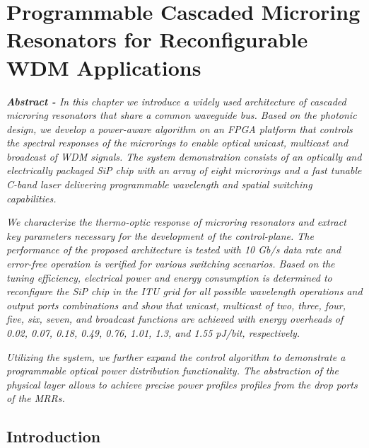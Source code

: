 
\pagestyle{plain}


\chapter[Cascaded Silicon Photonic Ring Resonators Architecture for Reconfigurable WDM Applications][Top of Page Title]{Programmable Cascaded Microring Resonators for Reconfigurable WDM Applications}

\textit{\textbf{Abstract -} In this chapter we introduce a widely used architecture of cascaded microring resonators that share a common waveguide bus. Based on the photonic design, we develop a power-aware algorithm on an FPGA platform that controls the spectral responses of the microrings to enable optical unicast, multicast and broadcast of WDM signals. The system demonstration consists of an optically and electrically packaged SiP chip with an array of eight microrings and a fast tunable C-band laser delivering programmable wavelength and spatial switching capabilities.}

\textit{We characterize the thermo-optic response of microring resonators and extract key parameters necessary for the development of the control-plane. The performance of the proposed architecture is tested with 10 Gb/s data rate and error-free operation is verified for various switching scenarios. Based on the tuning efficiency, electrical power and energy consumption is determined to reconfigure the SiP chip in the ITU grid for all possible wavelength operations and output ports combinations and show that unicast, multicast of two, three, four, five, six, seven, and broadcast functions are achieved with energy overheads of 0.02, 0.07, 0.18, 0.49, 0.76, 1.01, 1.3, and 1.55 pJ/bit, respectively.}

\textit{Utilizing the system, we further expand the control algorithm to demonstrate a programmable optical power distribution functionality. The abstraction of the physical layer allows to achieve precise power profiles profiles from the drop ports of the MRRs.}

\section{Introduction}

